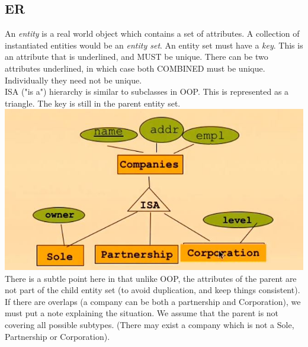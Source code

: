\documentclass[12pt]{article}
\theoremstyle{definition}
\begin{document}
\subsection{ER}
An \textit{entity} is a real world object which contains a set of attributes. A collection of instantiated entities would be an \textit{entity set}. An entity set must have a \textit{key}. This is an attribute that is underlined, and MUST be unique. There can be two attributes underlined, in which case both COMBINED must be unique. Individually they need not be unique. 
\\ \linebreak
ISA ("is a") hierarchy is similar to subclasses in OOP. This is represented as a triangle. The key is still in the parent entity set. 
\\ \includegraphics{isa}\\
There is a subtle point here in that unlike OOP, the attributes of the parent are not part of the child entity set (to avoid duplication, and keep things consistent).
\\ \linebreak
 If there are overlaps (a company can be both a partnership and Corporation), we must put a note explaining the situation. We assume that the parent is not covering all possible subtypes. (There may exist a company which is not a Sole, Partnership or Corporation).
\end{document}
